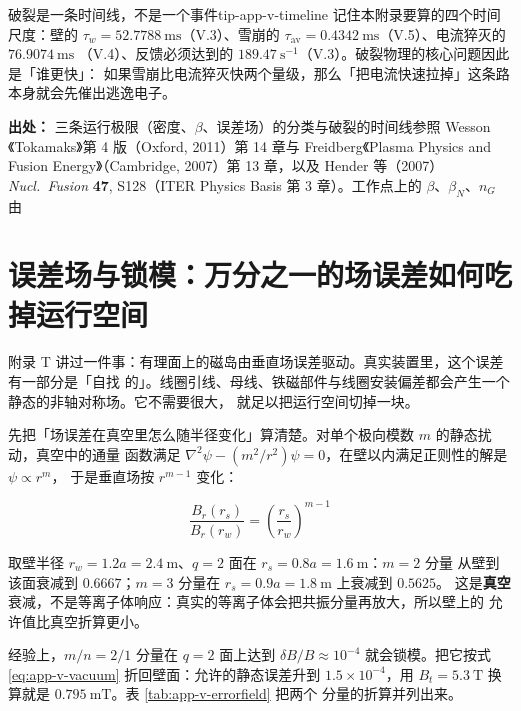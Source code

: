 \begin{tip}{破裂是一条时间线，不是一个事件}{tip-app-v-timeline}
记住本附录要算的四个时间尺度：壁的 $\tau_w=52.7788\ \mathrm{ms}$（V.3）、雪崩的
$\tau_{\mathrm{av}}=0.4342\ \mathrm{ms}$（V.5）、电流猝灭的 $76.9074\ \mathrm{ms}$
（V.4）、反馈必须达到的 $189.47\ \mathrm{s^{-1}}$（V.3）。破裂物理的核心问题因此是「谁更快」：
如果雪崩比电流猝灭快两个量级，那么「把电流快速拉掉」这条路本身就会先催出逃逸电子。
\end{tip}

{\footnotesize
\textbf{出处：} 三条运行极限（密度、$\beta$、误差场）的分类与破裂的时间线参照 Wesson
《Tokamaks》第 4 版（Oxford, 2011）第 14 章与 Freidberg《Plasma Physics and Fusion
Energy》（Cambridge, 2007）第 13 章，以及 Hender 等（2007）\textit{Nucl.\ Fusion}
\textbf{47}, S128（ITER Physics Basis 第 3 章）。工作点上的 $\beta$、$\beta_N$、$n_G$
由
}

\section{误差场与锁模：万分之一的场误差如何吃掉运行空间}
\label{sec:app-v-errorfield}

附录 T 讲过一件事：有理面上的磁岛由垂直场误差驱动。真实装置里，这个误差有一部分是「自找
的」。线圈引线、母线、铁磁部件与线圈安装偏差都会产生一个静态的非轴对称场。它不需要很大，
就足以把运行空间切掉一块。

先把「场误差在真空里怎么随半径变化」算清楚。对单个极向模数 $m$ 的静态扰动，真空中的通量
函数满足 $\nabla^2\psi-(m^2/r^2)\psi=0$，在壁以内满足正则性的解是 $\psi\propto r^m$，
于是垂直场按 $r^{m-1}$ 变化：

\begin{equation}
\frac{B_r(r_s)}{B_r(r_w)} = \left(\frac{r_s}{r_w}\right)^{m-1}
\label{eq:app-v-vacuum}
\end{equation}

取壁半径 $r_w=1.2a=2.4\ \mathrm{m}$、$q=2$ 面在 $r_s=0.8a=1.6\ \mathrm{m}$：$m=2$ 分量
从壁到该面衰减到 $0.6667$；$m=3$ 分量在 $r_s=0.9a=1.8\ \mathrm{m}$ 上衰减到 $0.5625$。
这是\textbf{真空}衰减，不是等离子体响应：真实的等离子体会把共振分量再放大，所以壁上的
允许值比真空折算更小。

经验上，$m/n=2/1$ 分量在 $q=2$ 面上达到 $\delta B/B\approx10^{-4}$ 就会锁模。把它按式
\eqref{eq:app-v-vacuum} 折回壁面：允许的静态误差升到 $1.5\times10^{-4}$，用
$B_t=5.3\ \mathrm{T}$ 换算就是 $0.795\ \mathrm{mT}$。表 \ref{tab:app-v-errorfield} 把两个
分量的折算并列出来。

